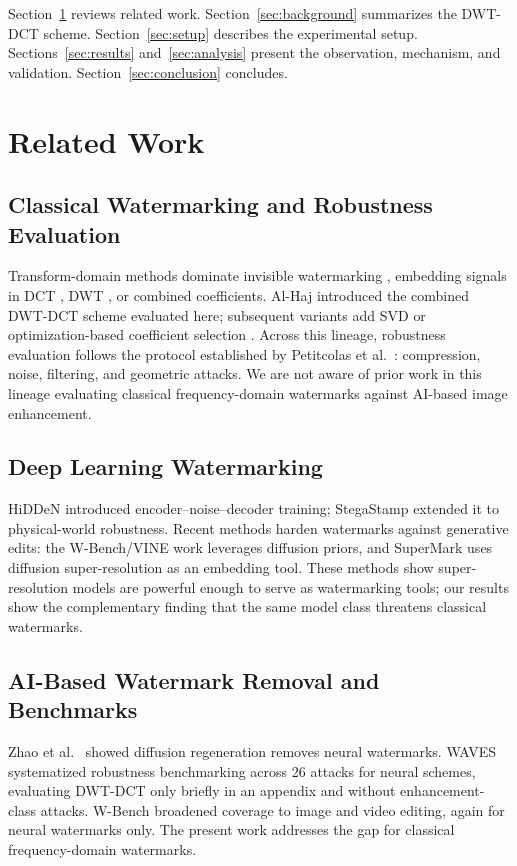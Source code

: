 \documentclass[conference]{IEEEtran}
\begin{document}
Section~\ref{sec:related} reviews related work.
Section~\ref{sec:background} summarizes the DWT-DCT scheme.
Section~\ref{sec:setup} describes the experimental setup.
Sections~\ref{sec:results} and~\ref{sec:analysis} present the
observation, mechanism, and validation. Section~\ref{sec:conclusion}
concludes.

\section{Related Work}
\label{sec:related}

\subsection{Classical Watermarking and Robustness Evaluation}
Transform-domain methods dominate invisible watermarking \cite{cox2007},
embedding signals in DCT \cite{piva1997}, DWT \cite{barni2001}, or
combined coefficients. Al-Haj \cite{alhaj2007} introduced the combined
DWT-DCT scheme evaluated here; subsequent variants add SVD \cite{navas2008}
or optimization-based coefficient selection \cite{rijati2025}. Across
this lineage, robustness evaluation follows the protocol established
by Petitcolas et al.~\cite{petitcolas1998}: compression, noise,
filtering, and geometric attacks. We are not aware of prior work in this
lineage evaluating classical frequency-domain watermarks against AI-based
image enhancement.

\subsection{Deep Learning Watermarking}
HiDDeN \cite{hidden2018} introduced encoder--noise--decoder training;
StegaStamp \cite{stegastamp2020} extended it to physical-world
robustness. Recent methods harden watermarks against generative edits:
the W-Bench/VINE work \cite{wbench2024} leverages diffusion priors, and
SuperMark \cite{supermark2024} uses diffusion super-resolution as an
embedding tool. These methods show super-resolution models are powerful
enough to serve as watermarking tools; our results show the complementary
finding that the same model class threatens classical watermarks.

\subsection{AI-Based Watermark Removal and Benchmarks}
Zhao et al.~\cite{zhao2023} showed diffusion regeneration removes neural
watermarks. WAVES \cite{waves2024} systematized robustness benchmarking
across 26 attacks for neural schemes, evaluating DWT-DCT only briefly in
an appendix and without enhancement-class attacks. W-Bench
\cite{wbench2024} broadened coverage to image and video editing, again
for neural watermarks only. The present work addresses the gap for
classical frequency-domain watermarks.
\end{document}
